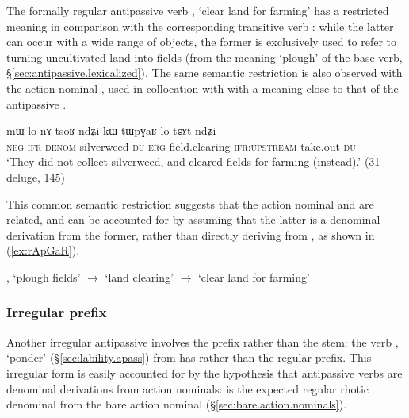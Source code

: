  The formally regular antipassive verb , `clear land for farming' has a restricted meaning in comparison with the corresponding transitive verb  : while the latter can occur with a wide range of objects, the former is exclusively used to refer to turning uncultivated land into fields (from the meaning `plough' of the base verb, §\ref{sec:antipassive.lexicalized}). The same semantic restriction is also observed with the action nominal , used in collocation with  with a meaning close to that of the antipassive .

 \begin{exe}
\ex \label{ex:tWpGaR.lotCAtndZi2}
\gll mɯ-lo-nɤ-tsoʁ-ndʑi kɯ tɯpɣaʁ lo-tɕɤt-ndʑi \\
\textsc{neg}-\textsc{ifr}-\textsc{denom}-silverweed-\textsc{du}  \textsc{erg} field.clearing \textsc{ifr}:\textsc{upstream}-take.out-\textsc{du} \\
\glt `They did not collect silverweed, and cleared fields for farming (instead).' (31-deluge, 145)
\end{exe}

This common semantic restriction suggests that the action nominal  and  are related, and can be accounted for by assuming that the latter is a denominal derivation from the former, rather than directly deriving from , as shown in (\ref{ex:rApGaR}).

\begin{exe}
\ex \label{ex:rApGaR}
\glt {}, `plough fields' $\rightarrow$  `land clearing' $\rightarrow$  `clear land for farming'
\end{exe}
 
\subsubsection{Irregular prefix} \label{sec:antipassive.irr.prefix} 
Another irregular antipassive involves the prefix rather than the stem: the verb , `ponder' (§\ref{sec:lability.apass}) from  has  rather than the regular  prefix. This irregular form is easily accounted for by the hypothesis that antipassive verbs are denominal derivations from action nominals:  is the expected regular rhotic denominal from the bare action nominal   (§\ref{sec:bare.action.nominals}).

